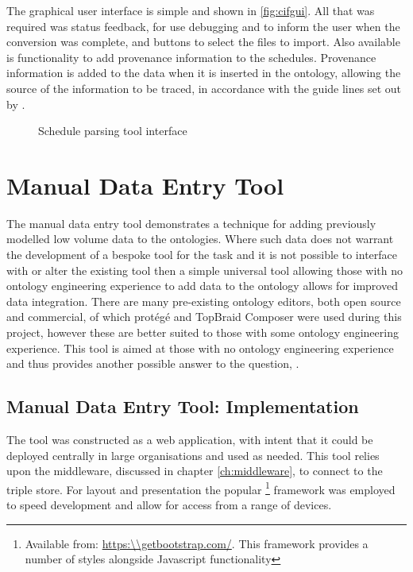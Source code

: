 The graphical user interface is simple and shown in \autoref{fig:cifgui}. All that was required was status feedback, for use debugging and to inform the user when the conversion was complete, and buttons to select the files to import. Also available is functionality to add provenance information to the schedules. Provenance information is added to the data when it is inserted in the ontology, allowing the source of the information to be traced, in accordance with the guide lines set out by \citet{Tutcher2015}.

\begin{figure}[H]
\myfloatalign
{}
\caption{Schedule parsing tool interface}
\label{fig:cifgui}
\end{figure}

\section{Manual Data Entry Tool}
\label{sec:manualtool}
The manual data entry tool demonstrates a technique for adding previously modelled low volume data to the ontologies. Where such data does not warrant the development of a bespoke tool for the task and it is not possible to interface with or alter the existing tool then a simple universal tool allowing those with no ontology engineering experience to add data to the ontology allows for improved data integration. There are many pre-existing ontology editors, both open source and commercial, of which protégé and TopBraid Composer were used during this project, however these are better suited to those with some ontology engineering experience. This tool is aimed at those with no ontology engineering experience and thus provides another possible answer to the question, \say{\QuestionOtherData}.

\subsection{Manual Data Entry Tool: Implementation}
The tool was constructed as a web application, with intent that it could be deployed centrally in large organisations and used as needed. This tool relies upon the middleware, discussed in chapter \ref{ch:middleware}, to connect to the triple store. For layout and presentation the popular \footnote{Available from: \url{https:\\getbootstrap.com/}. This framework provides a number of styles alongside Javascript functionality} framework was employed to speed development and allow for access from a range of devices.

